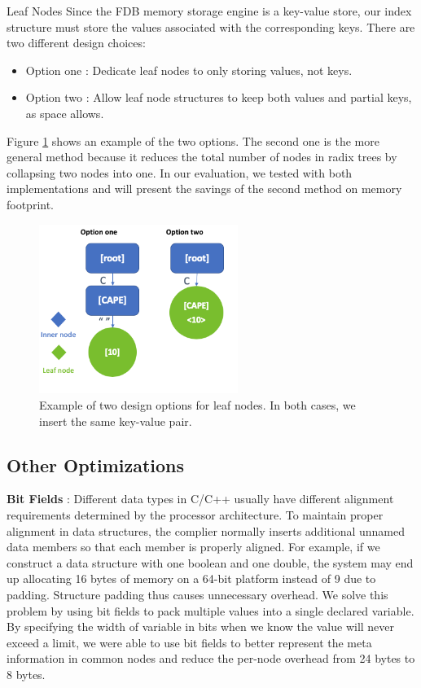 \documentclass[sigplan,screen,nonacm]{acmart}
\makeatletter
\def\subsubsection{\@startsection{subsubsection}{3}%
  \z@{.5\linespacing\@plus.7\linespacing}{.1\linespacing}%
  {\normalfont\itshape}}
\makeatother
\begin{document}
\subsubsection{Leaf Nodes}
Since the FDB memory storage engine is a key-value store, our index structure must store the values associated with the corresponding keys. There are two different design choices: 
\begin{itemize}
    \item Option one : Dedicate leaf nodes to only storing values, not keys.     \item Option two : Allow leaf node structures to keep both values and partial keys, as space allows.
\end{itemize}
Figure \ref{fig:leaf-nodes} shows an example of the two options. The second one is the more general method because it reduces the total number of nodes in radix trees by collapsing two nodes into one. In our evaluation, we tested with both implementations and will present the savings of the second method on memory footprint. 
\begin{figure}[h]
  \centering
  \includegraphics[width=\linewidth, height=5.5cm]{pic/leaf nodes.png}
  \setlength{\belowcaptionskip}{-10pt} 
  \caption{Example of two design options for leaf nodes. In both cases, we insert the same key-value pair.}
  \label{fig:leaf-nodes}
\end{figure}

\subsection{Other Optimizations}
\textbf {Bit Fields} : Different data types in C/C++ usually have different alignment requirements determined by the processor architecture. To maintain proper alignment in data structures, the complier normally inserts additional unnamed data members so that each member is properly aligned. For example, if we construct a data structure with one boolean and one double, the system may end up allocating 16 bytes of memory on a 64-bit platform instead of 9 due to padding. Structure padding thus causes unnecessary overhead.  We solve this problem by using bit fields to pack multiple values into a single declared variable. By specifying the width of variable in bits when we know the value will never exceed a limit, we were able to use bit fields to better represent the meta information in common nodes and reduce the per-node overhead from 24 bytes to 8 bytes.
\end{document}
